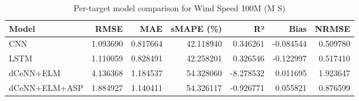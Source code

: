 \begin{table}
\caption{Per-target model comparison for Wind Speed 100M (M S)}
\begin{tabular}{lrrrrrr}
\toprule
Model & RMSE & MAE & sMAPE (\%) & R² & Bias & NRMSE \\
\midrule
CNN & 1.093690 & 0.817664 & 42.118940 & 0.346261 & -0.084544 & 0.509780 \\
LSTM & 1.110059 & 0.828491 & 42.258201 & 0.326546 & -0.122997 & 0.517410 \\
dCeNN+ELM & 4.136368 & 1.184537 & 54.328060 & -8.278532 & 0.011695 & 1.923647 \\
dCeNN+ELM+ASP & 1.884927 & 1.140411 & 54.326117 & -0.926771 & 0.055821 & 0.876599 \\
\bottomrule
\end{tabular}
\end{table}
